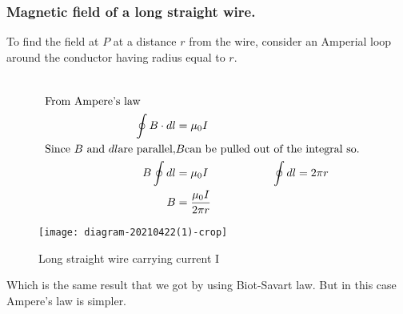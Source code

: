 \subsubsection{Magnetic field of a long straight wire. }
To find the field at $P$ at a distance $r$ from the wire, consider an Amperial loop around the conductor having radius equal to $r$.\\
\begin{minipage}{0.65\textwidth}
\begin{align*}\\
\intertext{From Ampere's law }
\oint B\cdot dl&=\mu_0 I\\
\text{Since}\ B \ \text{and} \ dl \text{are parallel} , &B\text{can be pulled out of the integral so.}\\
B\oint dl&=\mu_0 I \hspace{2cm}  \oint dl=2\pi r\\
B&=\frac{\mu_0 I}{2\pi r}
\end{align*}
\end{minipage}
\begin{minipage}{0.35\textwidth}
	\begin{figure}[H]
		\centering
		\texttt{[image: diagram-20210422(1)-crop]}
		\caption{Long straight wire carrying current I}
		\label{Long straight wire}
	\end{figure}
\end{minipage}


Which is the same result that we got by using Biot-Savart law. But in this case Ampere's law is simpler.\\

